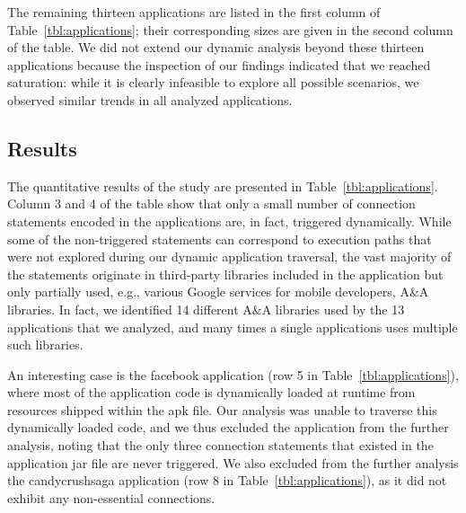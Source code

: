 The remaining thirteen applications are listed in the first column of Table~\ref{tbl:applications}; their corresponding sizes are given in the second column of the table. 
We did not extend our dynamic analysis beyond these thirteen applications because the inspection of our findings indicated that we reached saturation: while it is clearly infeasible to explore all possible scenarios, we observed similar trends in all analyzed applications. 

\subsection{Results}
The quantitative results of the study are presented in %
Table~\ref{tbl:applications}. 
Column 3 and 4 of the table show that only a small number of connection statements encoded in the applications are, in fact, triggered dynamically. 
While some of the non-triggered statements can correspond to execution paths that were not explored during our dynamic application traversal, the vast majority of the statements originate in  
third-party libraries included in the application but only partially used, e.g., various Google services for mobile developers, A\&A libraries.
In fact, we identified 14 different A\&A libraries used by the 13 applications that we analyzed, 
and many times a single applications uses multiple such libraries.

An interesting case is the facebook application (row 5 in Table~\ref{tbl:applications}), where most of the application code is dynamically loaded at runtime from resources shipped within the apk file. 
Our analysis was unable to traverse this dynamically loaded code, and we thus excluded the application from the further analysis, noting that the only three connection statements that existed in the application jar file are never triggered. We also excluded from the further analysis the candycrushsaga application (row 8 in Table~\ref{tbl:applications}), as it did not exhibit any non-essential connections.

